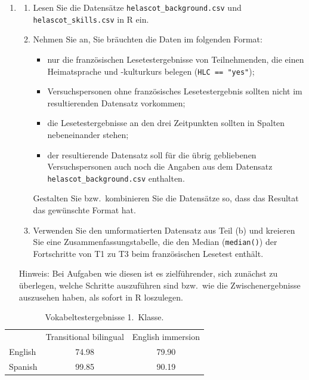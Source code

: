 \documentclass[oneside, 10pt]{book}\usepackage[]{graphicx}\usepackage[]{xcolor}
\begin{document}
\begin{enumerate}
  \item \begin{enumerate}
\item Lesen Sie die Datensätze \texttt{helascot\_background.csv}
und \texttt{helascot\_skills.csv} in R ein.



\item Nehmen Sie an, Sie bräuchten die Daten im folgenden Format:
\begin{itemize}
 \item nur die französischen Lesetestergebnisse von Teilnehmenden, die
       einen Heimatsprache und -kulturkurs
       belegen (\texttt{HLC == "yes"});
 \item Versuchspersonen ohne französisches Lesetestergebnis
       sollten nicht im resultierenden Datensatz vorkommen;
 \item die Lesetestergebnisse an den drei Zeitpunkten sollten
       in Spalten nebeneinander stehen;
 \item der resultierende Datensatz soll für die übrig gebliebenen Versuchspersonen
       auch noch die Angaben aus dem 
       Datensatz \texttt{helascot\_background.csv} enthalten.
\end{itemize}
Gestalten Sie bzw.\ kombinieren Sie die Datensätze so, dass
das Resultat das gewünschte Format hat.

\item Verwenden Sie den umformatierten Datensatz aus Teil (b)
und kreieren Sie eine Zusammenfassungstabelle, die den
Median (\texttt{median()})
der Fortschritte von T1 zu T3 beim französischen Lesetest enthält.
\end{enumerate}

Hinweis: Bei Aufgaben wie diesen ist es zielführender,
sich zunächst zu überlegen, welche Schritte auszuführen sind bzw.\
wie die Zwischenergebnisse auszusehen haben, als sofort
in R loszulegen.

\end{enumerate}

\begin{table}[h]
\centering

\caption{Vokabeltestergebnisse 1.\ Klasse.}
\label{tab:slavin_1}
\begin{tabular}{@{}lcc@{}}
            & Transitional bilingual  & English immersion \\
 English    & 74.98                   & 79.90 \\
 Spanish    & 99.85                   & 90.19
\end{tabular}
\end{table}
\end{document}
